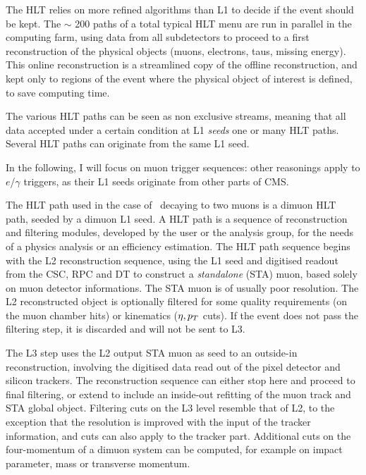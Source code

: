 The HLT relies on more refined algorithms than L1 to decide if the
event should be kept. The
$\sim$ 200 paths of a total typical HLT menu are run in parallel in the computing farm, using data from all subdetectors to
proceed to a first reconstruction of the physical objects (muons, electrons, taus, missing energy). This online reconstruction
is a streamlined copy of the offline reconstruction, and kept only to regions of the event where the physical
object of interest is defined, to save computing time.

The various HLT paths can be seen as non exclusive streams, meaning that all data accepted under a certain condition at
L1 \textit{seeds} one or many HLT paths. Several HLT paths can
originate from the same L1 seed. 

In the following, I will focus on muon trigger sequences: other
reasonings apply to $e$/$\gamma$ triggers, as their L1 seeds originate
from other parts of CMS. 


 The HLT path used in the case of \PgU\ decaying to two
muons is a dimuon HLT path, seeded by a dimuon
L1 seed. A HLT path is a sequence of reconstruction and filtering
modules, developed by the user or the analysis group, for the needs of
a physics analysis or an efficiency estimation. The HLT path sequence
begins with the L2 reconstruction sequence, using the L1 seed and
digitised readout from the CSC, RPC and DT to construct
a \textit{standalone} (STA) muon, based solely on muon detector
informations. The STA muon is of usually poor resolution. The L2
reconstructed object is optionally filtered for some quality
requirements (on the muon chamber hits) or kinematics ($\eta, p_{T}$
cuts). If the event does not pass the filtering step, it is discarded
and will not be sent to L3.

The L3 step uses the L2 output STA muon as seed to an outside-in
reconstruction, involving the digitised data read out of the pixel
detector and silicon trackers. The reconstruction sequence can either
stop here and proceed to final filtering, or extend to include an
inside-out refitting of the muon track and STA global object.
Filtering cuts on the L3 level resemble that of L2, to the exception
that the resolution is improved with the input of the tracker
information, and cuts can also apply to the tracker part. Additional cuts on the four-momentum of a dimuon system
can be computed, for example on impact parameter, mass or transverse momentum.




